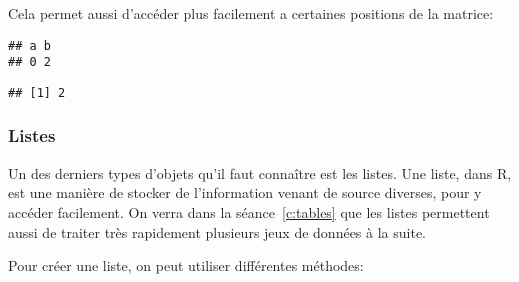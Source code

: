 Cela permet aussi d'accéder plus facilement a certaines positions de la matrice:

\begin{knitrout}
\color{fgcolor}\begin{kframe}
\begin{flushleft}
\ttfamily\noindent
{}\hlkeyword{[}\hlkeyword{,}{\ }\hlkeyword{]}\mbox{}
\normalfont
\end{flushleft}
\begin{verbatim}
## a b 
## 0 2 
\end{verbatim}
\begin{flushleft}
\ttfamily\noindent
{}\hlkeyword{[}\hlkeyword{,}{\ }\hlkeyword{]}\mbox{}
\normalfont
\end{flushleft}
\begin{verbatim}
## [1] 2
\end{verbatim}
\end{kframe}
\end{knitrout}


\subsubsection{Listes}

Un des derniers types d'objets qu'il faut connaître est les listes.
Une liste, dans R, est une manière de stocker de l'information venant de source diverses, pour y accéder facilement.
On verra dans la séance~\ref{c:tables} que les listes permettent aussi de traiter très rapidement plusieurs jeux de données à la suite.

Pour créer une liste, on peut utiliser différentes méthodes:

